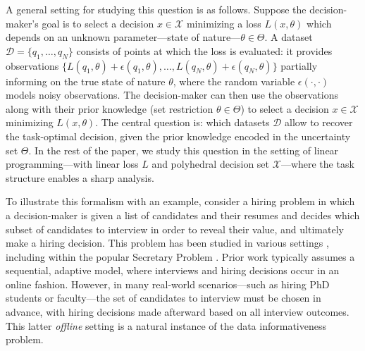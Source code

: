 \documentclass[11pt]{article}
\theoremstyle{plain}
\theoremstyle{definition}
\newcommand{\cX}{\mathcal{X}}
\newcommand{\cD}{\mathcal{D}}
\begin{document}
A general setting for studying this question is as follows.
Suppose the decision-maker's goal is to select a decision $x \in \cX$ minimizing a loss $L(x,\theta)$ which depends on an unknown parameter---state of nature---$\theta \in \Theta$. A dataset $\cD = \{q_1,\ldots,q_N\}$ consists of points at which the loss is evaluated: it provides observations $\{L(q_1,\theta) + \epsilon(q_1,\theta), \ldots, L(q_N,\theta) + \epsilon(q_N,\theta)\}$ partially informing on the true state of nature $\theta$, where the random variable $\epsilon(\cdot,\cdot)$ models noisy observations. The decision-maker can then use the observations along with their prior knowledge (set restriction $\theta \in \Theta$) to select a decision $x \in \cX$ minimizing $L(x,\theta)$. The central question is: which datasets $\cD$ allow to recover the task-optimal decision, given the prior knowledge encoded in the uncertainty set $\Theta$.
In the rest of the paper, we study this question in the setting of linear programming---with linear loss $L$ and polyhedral decision set $\cX$---where the task structure enables a sharp analysis.

To illustrate this formalism with an example, consider a hiring problem in which a decision-maker is given a list of candidates and their resumes and decides which subset of candidates to interview in order to reveal their value, and ultimately make a hiring decision.
This problem has been studied in various settings \citep{purohitHiringUncertainty2019, epsteinSelectionOrdering2024}, including within the popular Secretary Problem \citep{kleinbergMultiplechoicesecretary2005,arlottoUniformlyBounded2019, brayDoesMultisecretary2019}. Prior work typically assumes a sequential, adaptive model, where interviews and hiring decisions occur in an online fashion. However, in many real-world scenarios---such as hiring PhD students or faculty---the set of candidates to interview must be chosen in advance, with hiring decisions made afterward based on all interview outcomes. This latter \textit{offline} setting is a natural instance of the data informativeness problem.
\end{document}
